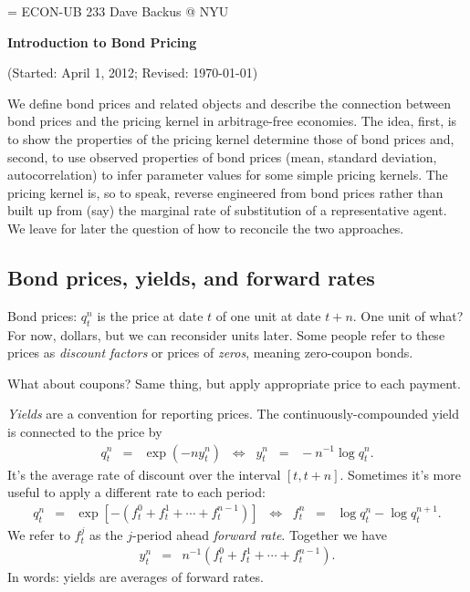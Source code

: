 \documentclass[11pt]{article}
\begin{document}
\parskip=\bigskipamount
\parindent=0.0in
\thispagestyle{empty}
{\large ECON-UB 233 \hfill Dave Backus @ NYU}

\bigskip\bigskip
\centerline{\Large \bf Introduction to Bond Pricing}
\centerline{(Started: April 1, 2012; Revised: \today)}

\bigskip
We define bond prices and related objects
and describe the connection between bond prices and the
pricing kernel in arbitrage-free economies.
The idea, first, is to show the properties of the pricing kernel
determine those of bond prices and, second,
to use observed properties of bond prices
(mean, standard deviation, autocorrelation)
to infer parameter values for some simple pricing kernels.
The pricing kernel is, so to speak, reverse engineered
from bond prices rather than built up from (say)
the marginal rate of substitution of a representative agent.
We leave for later the question of how to reconcile
the two approaches.


\subsection*{Bond prices, yields, and forward rates}

Bond prices:
$q^n_t$ is the price at date $t$ of one unit
at date $t+n$.
One unit of what?
For now, dollars, but we can reconsider units later.
Some people refer to these prices as {\it discount factors\/}
or prices of {\it zeros\/}, meaning zero-coupon bonds.

What about coupons?  Same thing, but apply appropriate price
to each payment.

{\it Yields\/} are a convention for reporting prices.
The continuously-compounded yield is connected to the price by
\begin{eqnarray}
    q^n_t &=&  \exp(- n y^n_t)
        \;\;\Leftrightarrow\;\;
        y^n_t \;\;=\;\; - n^{-1} \log q^n_t .
        \label{eq:yields}
\end{eqnarray}
It's the average rate of discount over the interval $[t, t+n]$.
Sometimes it's more useful to apply a different
rate to each period:
\begin{eqnarray}
    q^n_t &=&  \exp[- (f^0_t + f^1_t + \cdots + f^{n-1}_t)]
        \;\;\Leftrightarrow\;\;
        f^n_t \;\;=\;\;  \log q^n_t - \log q^{n+1}_t .
        \label{eq:forwards}
\end{eqnarray}
We refer to $f^j_t$ as the $j$-period ahead {\it forward rate\/}.
Together we have
\begin{eqnarray*}
    y^n_t &=&  n^{-1} \left( f^0_t + f^1_t + \cdots + f^{n-1}_t \right).
\end{eqnarray*}
In words:  yields are averages of forward rates.
\end{document}
